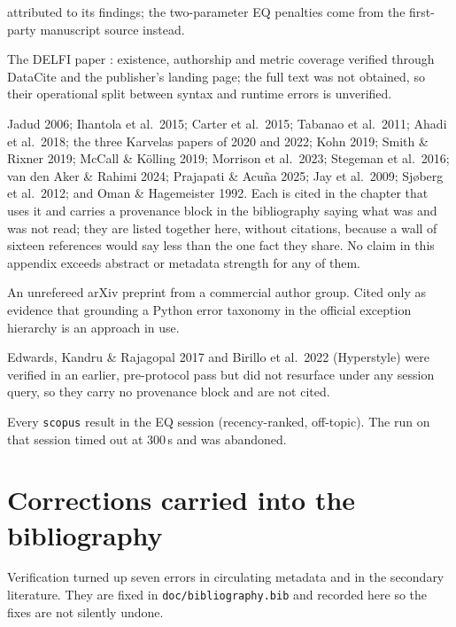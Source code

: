 \begin{description}
  attributed to its
  findings; the two-parameter EQ penalties come from the first-party
  manuscript source instead.
\item[Brocker \& Schroeder 2024] The DELFI paper
  \autocite{brocker2024correlation}: existence, authorship and metric
  coverage verified through DataCite and the publisher's landing page; the
  full text was not obtained, so their
  operational split between syntax and runtime errors is unverified.
\item[Abstract- or metadata-strength only] Jadud 2006; Ihantola et al.\
  2015; Carter et al.\ 2015; Tabanao et al.\ 2011; Ahadi et al.\ 2018; the
  three Karvelas papers of 2020 and 2022; Kohn 2019; Smith \& Rixner 2019;
  McCall \& K\"olling 2019; Morrison et al.\ 2023; Stegeman et al.\ 2016;
  van den Aker \& Rahimi 2024; Prajapati \& Acu\~na 2025; Jay et al.\ 2009;
  Sj\o berg et al.\ 2012; and Oman \& Hagemeister 1992.  Each is cited in
  the chapter that uses it and carries a provenance block in the
  bibliography saying what was and was not read; they are listed together
  here, without citations, because a wall of sixteen references would say
  less than the one fact they share.  No claim in this appendix exceeds
  abstract or metadata strength for any of them.
\item[PyMETA] An unrefereed arXiv preprint \autocite{li2026pymeta} from a
  commercial author group.  Cited only as evidence that grounding a Python
  error taxonomy in the official exception hierarchy is an approach in use.
\item[Not re-found under a recorded query] Edwards, Kandru \& Rajagopal
  2017 and Birillo et al.\ 2022 (Hyperstyle) were verified in an earlier,
  pre-protocol pass but did not resurface under any session query, so they
  carry no provenance block and are not cited.
\item[Discarded wholesale] Every \texttt{scopus} result in the EQ session
  (recency-ranked, off-topic).  The \qy{scholar enrich} run on that
  session timed out at 300\,s and was abandoned.
\end{description}

\section{Corrections carried into the bibliography}
\label{app:protocol:corrections}

Verification turned up seven errors in circulating metadata and in the
secondary literature.  They are fixed in \nolinkurl{doc/bibliography.bib} and
recorded here so the fixes are not silently undone.


